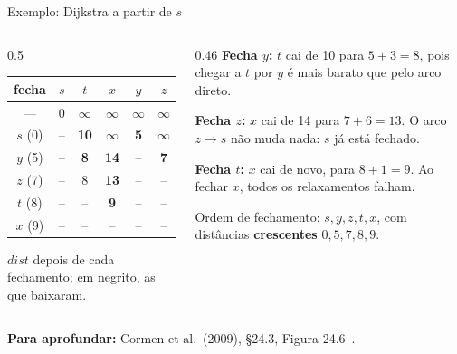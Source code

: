 \documentclass[aspectratio=169,xcolor=table]{beamer}
\newcommand{\fonte}[1]{%
  \vfill
  {\tiny\color{gray!55!black}\textbf{Para aprofundar:} #1\par}%
}
\begin{document}
\begin{frame}{Exemplo: Dijkstra a partir de $s$}
  \begin{columns}[c]
    \begin{column}{0.5\textwidth}
      \centering\scriptsize
      \setlength{\tabcolsep}{3.5pt}
      \begin{tabular}{c|ccccc}
        \toprule
        fecha & $s$ & $t$ & $x$ & $y$ & $z$ \\
        \midrule
        --- & 0 & $\infty$ & $\infty$ & $\infty$ & $\infty$ \\
        $s$ (0) & -- & \textbf{10} & $\infty$ & \textbf{5} & $\infty$ \\
        $y$ (5) & -- & \textbf{8} & \textbf{14} & -- & \textbf{7} \\
        $z$ (7) & -- & 8 & \textbf{13} & -- & -- \\
        $t$ (8) & -- & -- & \textbf{9} & -- & -- \\
        $x$ (9) & -- & -- & -- & -- & -- \\
        \bottomrule
      \end{tabular}
      \smallskip

      \raggedright
      $\mathit{dist}$ depois de cada fechamento; em negrito, as que baixaram.
    \end{column}
    \begin{column}{0.46\textwidth}
      \scriptsize
      \textbf{Fecha $y$:} $t$ cai de 10 para $5 + 3 = 8$, pois chegar a $t$ por $y$ é mais
      barato que pelo arco direto.
      \medskip

      \textbf{Fecha $z$:} $x$ cai de 14 para $7 + 6 = 13$. O arco $z \to s$ não muda nada:
      $s$ já está fechado.
      \medskip

      \textbf{Fecha $t$:} $x$ cai de novo, para $8 + 1 = 9$. Ao fechar $x$, todos os
      relaxamentos falham.
      \medskip

      Ordem de fechamento: $s, y, z, t, x$, com distâncias \textbf{crescentes}
      $0, 5, 7, 8, 9$.
    \end{column}
  \end{columns}
  \fonte{Cormen et al.\ (2009), \S 24.3, Figura 24.6~\cite{cormen2009introduction}.}
\end{frame}
\end{document}
